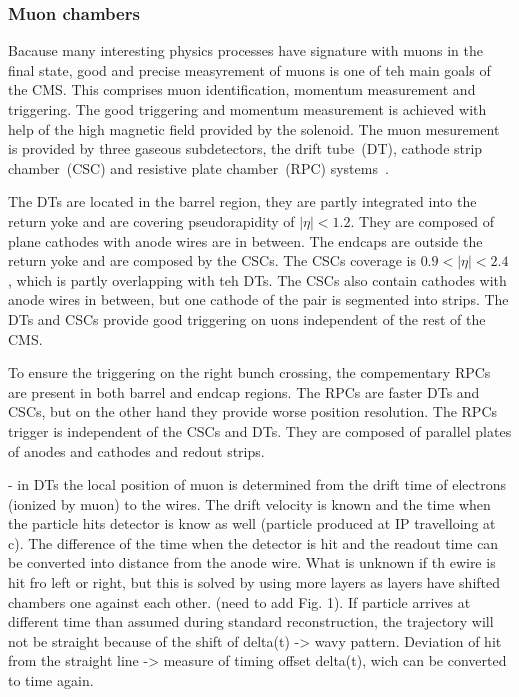 \subsubsection{Muon chambers}

Bacause many interesting physics processes have signature with muons in the final state, good and precise measyrement of muons is one of teh main goals of the CMS. This comprises muon identification, momentum measurement and triggering. The good triggering and momentum measurement is achieved with help of the high magnetic field provided by the solenoid. The muon mesurement is provided by three gaseous subdetectors, the drift tube~(DT), cathode strip chamber~(CSC) and resistive plate chamber~(RPC) systems~\cite{tdrMuon}.

The DTs are located in the barrel region, they are partly integrated into the return yoke and are covering pseudorapidity of $|\eta|<1.2$. They are composed of plane cathodes with anode wires are in between. The endcaps are outside the return yoke and are composed by the CSCs. The CSCs coverage is $0.9<|\eta|<2.4$, which is partly overlapping with teh DTs. The CSCs also contain cathodes with anode wires in between, but one cathode of the pair is segmented into strips. The DTs and CSCs provide good triggering on uons independent of the rest of the CMS.

To ensure the triggering on the right bunch crossing, the compementary RPCs are present in both barrel and endcap regions. The RPCs are faster DTs and CSCs, but on the other hand they provide worse position resolution. The RPCs trigger is independent of the CSCs and DTs. They are composed of parallel plates of anodes and cathodes and redout strips. 


- in DTs the local position of muon is determined from the drift time of electrons (ionized by muon) to the wires. The drift velocity is known and the time when the particle hits detector is know as well (particle produced at IP travelloing at c). The difference of the time when the detector is hit and the readout time can be converted into distance from the anode wire. What is unknown if th ewire is hit fro left or right, but this is solved by using more layers as layers have shifted chambers one against each other. (need to add Fig. 1). If particle arrives at different time than assumed during standard reconstruction, the trajectory will not be straight because of the shift of delta(t) -> wavy pattern. Deviation of hit from the straight line -> measure of timing offset delta(t), wich can be converted to time again.


